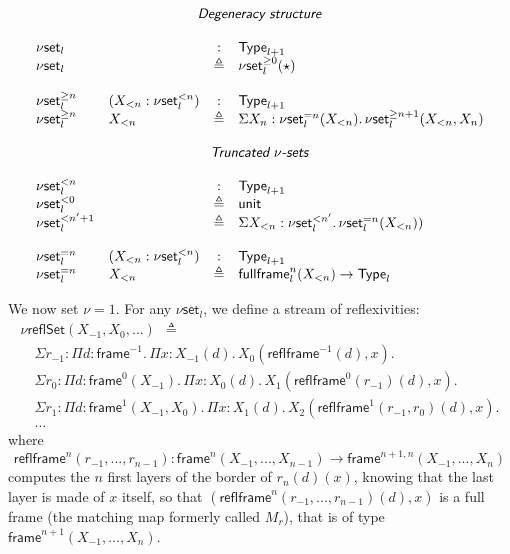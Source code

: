 \documentclass[12pt,landscape]{article}
\newcommand{\sort}[1]{\mathsf{Type}_{#1}}
\newcommand{\defeq}{\triangleq}
\newcommand{\partialcubset}[2]{\mathsf{\nu set}_{#1}^{<#2}}
\newcommand{\mycubset}[1]{\mathsf{\nu set}_{#1}}
\newcommand{\mycubsetfrom}[2]{\mathsf{\nu set}_{#1}^{\geq#2}}
\newcommand{\mycubsetcomp}[2]{\mathsf{\nu set}_{#1}^{=#2}}
\newcommand{\myfullbox}[1]{\mathsf{fullframe}_{#1}}
\newcommand{\unittype}{\mathsf{unit}}
\begin{document}
\begin{Large}
\begin{sf}
$$
\begin{array}{llcl}
\multicolumn{4}{c}{\mbox{\textsf{\textit{Degeneracy structure}}}}\\
\\
\mycubset{l} && : & \sort{l+1}\\
\mycubset{l} && \defeq & \mycubsetfrom{l}{0}(\star)\\
\\
\mycubsetfrom{l}{n} & (X_{<n}:\partialcubset{l}{n}) & : & \sort{l+1}\\
\mycubsetfrom{l}{n} & X_{<n} & \defeq & \Sigma X_n:\mycubsetcomp{l}{n}(X_{<n}).\,\mycubsetfrom{l}{n+1}(X_{<n},X_n)\\
\\
\multicolumn{4}{c}{\mbox{\textsf{\textit{Truncated $\nu$-sets}}}}\\
\\
\partialcubset{l}{n} && : & \sort{l+1}\\
\partialcubset{l}{0} && \defeq & \unittype\\
\partialcubset{l}{n'+1} && \defeq & \Sigma X_{<n}:\partialcubset{l}{n'}.\,\mycubsetcomp{l}{n}(X_{<n}))\\
\\
\mycubsetcomp{l}{n} & (X_{<n}:\partialcubset{l}{n}) & : & \sort{l+1}\\
\mycubsetcomp{l}{n} & X_{<n} & \defeq & \myfullbox{l}^{n}(X_{<n})\rightarrow \sort{l}\\
\end{array}
$$
\fi

We now set $\nu = 1$. For any $\mycubset{l}$, we define a stream of reflexivities:
$$
\begin{array}{lll}
\nu\textsf{reflSet}(X_{-1},X_0,...) ~~ \defeq \\
\quad \Sigma r_{-1}:\Pi d:\mathsf{frame}^{-1}.\,\Pi x:X_{-1}(d).\,X_0(\mathsf{reflframe}^{-1}(d),x).\\
\quad \Sigma r_0:\Pi d:\mathsf{frame}^0(X_{-1}).\,\Pi x:X_{0}(d).\,X_1(\mathsf{reflframe}^0(r_{-1})(d),x).\\
\quad \Sigma r_1:\Pi d:\mathsf{frame}^1(X_{-1},X_0).\,\Pi x:X_{1}(d).\,X_2(\mathsf{reflframe}^1(r_{-1},r_0)(d),x).\\
\quad ...
\end{array}
$$
where
$$\mathsf{reflframe}^n(r_{-1},...,r_{n-1}):\mathsf{frame}^n(X_{-1},...,X_{n-1})
\rightarrow \mathsf{frame}^{n+1,n}(X_{-1},...,X_{n})$$ computes the
$n$ first layers of the border of $r_{n}(d)(x)$, knowing that the last
layer is made of $x$ itself, so that
$(\mathsf{reflframe}^n(r_{-1},...,r_{n-1})(d),x)$ is a full frame (the matching map formerly called $M_r$),
that is of type $\mathsf{frame}^{n+1}(X_{-1},...,X_{n})$.


\end{sf}
\end{Large}
\end{document}
